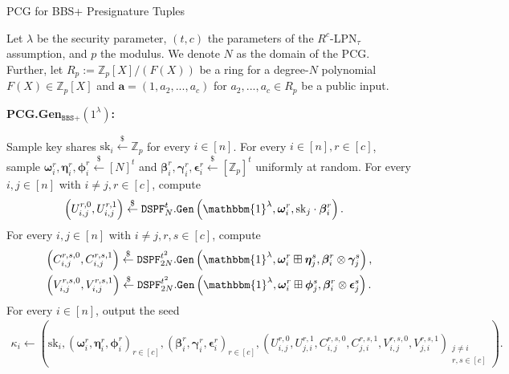 \begin{specialconstruction}{PCG for BBS+ Presignature Tuples}
\label{construction:PCGforBBS+}
\vspace{1em}

Let $\lambda$ be the security parameter, $(t,c)$ the parameters of the $R^c$-LPN$_\tau$ assumption, and $p$ the modulus. We denote $N$ as the domain of the PCG. Further, let $R_p:=\mathbb{Z}_{p}[X]/(F(X))$ be a ring for a degree-$N$ polynomial $F(X) \in \mathbb{Z}_{p}[X]$ and $\boldsymbol{a} = (1, a_2, ..., a_c)$ for $a_2, ...,a_c \in R_p$ be a public input.

\vspace{1em}

\textbf{PCG.Gen$_{\texttt{BBS+}}(1^\lambda)$:}

\begin{algorithmic}[1]
\State Sample key shares $\mathrm{sk}_{i} \stackrel{\$}{\leftarrow} \mathbb{Z}_{p}$ for every $i \in [n]$.
\State For every $i \in [n], r \in [c]$, sample $\boldsymbol{\omega}_{i}^{r}, \boldsymbol{\eta}_{i}^{r}, \boldsymbol{\phi}_{i}^{r} \stackrel{\$}{\leftarrow} [N]^{t}$ and $\boldsymbol{\beta}_{i}^{r}, \boldsymbol{\gamma}_{i}^{r}, \boldsymbol{\epsilon}_{i}^{r} \stackrel{\$}{\leftarrow} [\mathbb{Z}_{p}]^{t}$ uniformly at random.
\State For every $i, j \in [n]$ with $i \neq j, r \in [c]$, compute
\begin{align*}
& \left(U_{i, j}^{r, 0}, U_{i, j}^{r, 1}\right) \stackrel{\$}{\leftarrow} \texttt{DSPF}_{N}^{t}.\texttt{Gen}\left(\mathbbm{1}^{\lambda}, \boldsymbol{\omega}_{i}^{r}, \mathrm{sk}_{j} \cdot \boldsymbol{\beta}_{i}^{r}\right).
\end{align*}
\State For every $i, j \in [n]$ with $i \neq j, r, s \in [c]$, compute
\begin{align*}
& \left(C_{i, j}^{r, s, 0}, C_{i, j}^{r, s, 1}\right)\stackrel{\$}{\leftarrow} \texttt{DSPF}_{2N}^{t^{2}}.\texttt{Gen}\left(\mathbbm{1}^{\lambda}, \boldsymbol{\omega}_{i}^{r} \boxplus \boldsymbol{\eta}_{j}^{s}, \boldsymbol{\beta}_{i}^{r} \otimes \boldsymbol{\gamma}_{j}^{s}\right), \\
& \left(V_{i, j}^{r, s, 0}, V_{i, j}^{r, s, 1}\right) \stackrel{\$}{\leftarrow} \texttt{DSPF}_{2N}^{t^{2}}.\texttt{Gen}\left(\mathbbm{1}^{\lambda}, \boldsymbol{\omega}_{i}^{r} \boxplus \boldsymbol{\phi}_{j}^{s}, \boldsymbol{\beta}_{i}^{r} \otimes \boldsymbol{\epsilon}_{j}^{s}\right).
\end{align*}
\State For every $i \in [n]$, output the seed
\begin{align*}
\kappa_{i} \leftarrow\left(\mathrm{sk}_{i},\left(\boldsymbol{\omega}_{i}^{r}, \boldsymbol{\eta}_{i}^{r}, \boldsymbol{\phi}_{i}^{r}\right)_{r \in [c]},\left(\boldsymbol{\beta}_{i}^{r}, \boldsymbol{\gamma}_{i}^{r}, \boldsymbol{\epsilon}_{i}^{r}\right)_{r \in [c]},\left(U_{i, j}^{r, 0}, U_{j, i}^{r, 1}, C_{i, j}^{r, s, 0}, C_{j, i}^{r, s, 1}, V_{i, j}^{r, s, 0}, V_{j, i}^{r, s, 1}\right)_{\substack{j \neq i \\ r, s \in [c]}}\right).
\end{align*}
\end{algorithmic}


\end{specialconstruction}
